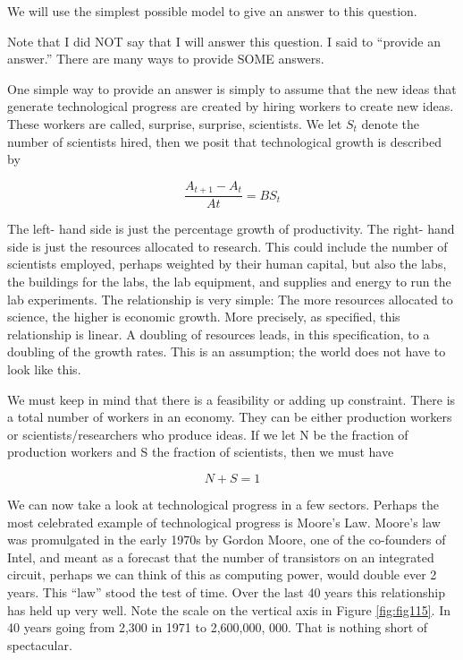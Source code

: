 \documentclass[
]{book}
\begin{document}
We will use the simplest possible model to give an answer to this question.

Note that I did NOT say that I will answer this question. I said to ``provide an answer.'' There are many ways to provide SOME answers.

One simple way to provide an answer is simply to assume that the new ideas that generate technological progress are created by hiring workers to create new ideas. These workers are called, surprise, surprise, scientists. We let \(S_t\) denote the number of scientists hired, then we posit that technological growth is described by

\[ \frac{A_{t+1} - A_t}{At}  =  B S_t\]

The left- hand side is just the percentage growth of productivity. The right- hand side is just the resources allocated to research. This could include the number of scientists employed, perhaps weighted by their human capital, but also the labs, the buildings for the labs, the lab equipment, and supplies and energy to run the lab experiments. The relationship is very simple: The more resources allocated to science, the higher is economic growth. More precisely, as specified, this relationship is linear. A doubling of resources leads, in this specification, to a doubling of the growth rates. This is an assumption; the world does not have to look like this.

We must keep in mind that there is a feasibility or adding up constraint. There is a total number of workers in an economy. They can be either production workers or scientists/researchers who produce ideas. If we let N be the fraction of production workers and S the fraction of scientists, then we must have

\[ N + S = 1 \]

We can now take a look at technological progress in a few sectors. Perhaps the most celebrated example of technological progress is Moore's Law. Moore's law was promulgated in the early 1970s by Gordon Moore, one of the co-founders of Intel, and meant as a forecast that the number of transistors on an integrated circuit, perhaps we can think of this as computing power, would double ever 2 years. This ``law'' stood the test of time. Over the last 40 years this relationship has held up very well. Note the scale on the vertical axis in Figure \ref{fig:fig115}. In 40 years going from 2,300 in 1971 to 2,600,000, 000. That is nothing short of spectacular.
\end{document}
